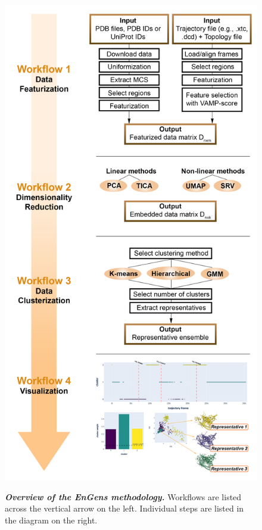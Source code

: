 \documentclass[numsec,webpdf,contemporary,large]{oup-authoring-template}
\theoremstyle{thmstyleone}%
\theoremstyle{thmstyletwo}%
\theoremstyle{thmstylethree}%
\begin{document}
\begin{figure}[!t]%
\centering
{\includegraphics[scale=0.7]{Engens_new.pdf}}
\caption{\textbf{\textit{ Overview of the EnGens methodology. }} Workflows
are listed across the vertical arrow on the left. Individual steps are listed in the diagram on the right.}
\label{fig-met}
\end{figure}
\end{document}
